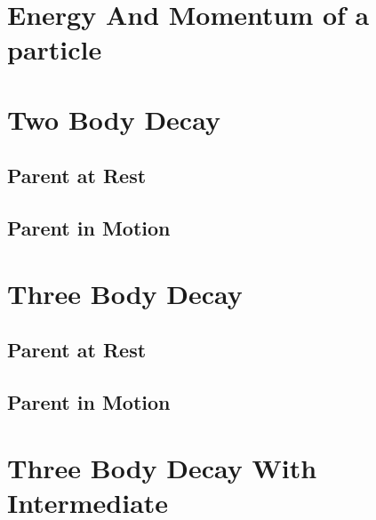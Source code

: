 \documentclass[a5paper,12pt]{article}
\begin{document}

\frontmatter
\tableofcontents
\listoftables
\listoffigures
\clearpage
\mainmatter
\section{Energy And Momentum of a particle}
\clearpage
\section{Two Body Decay}
\subsection{Parent at Rest}
\subsection{Parent in Motion}
\section{Three Body Decay}
\subsection{Parent at Rest}
\subsection{Parent in Motion}
\section{Three Body Decay With Intermediate}
\clearpage
{}
\printindex
\end{document}
